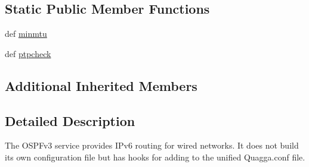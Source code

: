 \subsection*{Static Public Member Functions}
\begin{DoxyCompactItemize}
\item 
def \hyperlink{classcore_1_1services_1_1quagga_1_1_ospfv3_ab8322e2daa6143afbff2de1ec8d491c4}{minmtu}
\item 
def \hyperlink{classcore_1_1services_1_1quagga_1_1_ospfv3_ad4609e0a37a374ecd9dc2d6caa13f157}{ptpcheck}
\end{DoxyCompactItemize}
\subsection*{Additional Inherited Members}


\subsection{Detailed Description}
\begin{DoxyVerb}The OSPFv3 service provides IPv6 routing for wired networks. It does
    not build its own configuration file but has hooks for adding to the
    unified Quagga.conf file.
\end{DoxyVerb}
 

